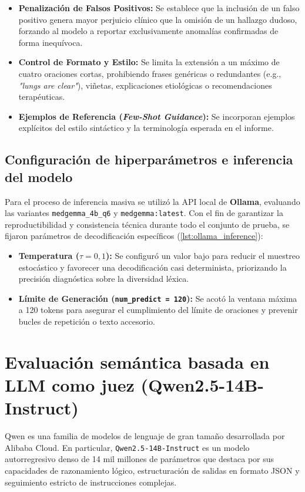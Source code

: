 \documentclass[../tesis.tex]{subfiles}
\begin{document}
\begin{itemize}
    \item \textbf{Penalización de Falsos Positivos:} Se establece que la inclusión de un falso positivo genera mayor perjuicio clínico que la omisión de un hallazgo dudoso, forzando al modelo a reportar exclusivamente anomalías confirmadas de forma inequívoca.
    \item \textbf{Control de Formato y Estilo:} Se limita la extensión a un máximo de cuatro oraciones cortas, prohibiendo frases genéricas o redundantes (e.g., \textit{"lungs are clear"}), viñetas, explicaciones etiológicas o recomendaciones terapéuticas.
    \item \textbf{Ejemplos de Referencia (\textit{Few-Shot Guidance}):} Se incorporan ejemplos explícitos del estilo sintáctico y la terminología esperada en el informe.
\end{itemize}

\subsection{Configuración de hiperparámetros e inferencia del modelo}
\label{subsec:inferencia_ollama}
Para el proceso de inferencia masiva se utilizó la API local de \textbf{Ollama}, evaluando las variantes \texttt{medgemma\_4b\_q6} y \texttt{medgemma:latest}. Con el fin de garantizar la reproductibilidad y consistencia técnica durante todo el conjunto de prueba, se fijaron parámetros de decodificación específicos (\autoref{lst:ollama_inference}):
\begin{itemize}
    \item \textbf{Temperatura ($\tau = 0{,}1$):} Se configuró un valor bajo para reducir el muestreo estocástico y favorecer una decodificación casi determinista, priorizando la precisión diagnóstica sobre la diversidad léxica.
    \item \textbf{Límite de Generación (\texttt{num\_predict = 120}):} Se acotó la ventana máxima a 120 tokens para asegurar el cumplimiento del límite de oraciones y prevenir bucles de repetición o texto accesorio.
\end{itemize}

\section{Evaluación semántica basada en LLM como juez (Qwen2.5-14B-Instruct)}
\label{sec:qwen_llm_juez}

Qwen es una familia de modelos de lenguaje de gran tamaño desarrollada por Alibaba Cloud. En particular, \texttt{Qwen2.5-14B-Instruct} es un modelo autorregresivo denso de 14 mil millones de parámetros que destaca por sus capacidades de razonamiento lógico, estructuración de salidas en formato JSON y seguimiento estricto de instrucciones complejas.
\end{document}
